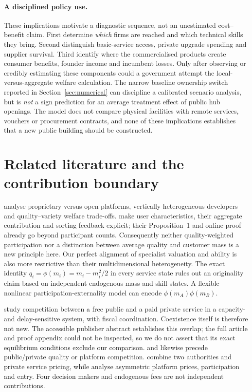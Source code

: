 \documentclass[11pt]{article}
\begin{document}
\paragraph{A disciplined policy use.}
These implications motivate a diagnostic sequence, not an unestimated cost--benefit claim. First determine \emph{which} firms are reached and which technical skills they bring. Second distinguish basic-service access, private upgrade spending and supplier survival. Third identify where the commercialised products create consumer benefits, founder income and incumbent losses. Only after observing or credibly estimating these components could a government attempt the local-versus-aggregate welfare calculation. The narrow baseline ownership switch reported in Section~\ref{sec:numerical} can discipline a calibrated scenario analysis, but is \emph{not} a sign prediction for an average treatment effect of public hub openings. The model does not compare physical facilities with remote services, vouchers or procurement contracts, and none of these implications establishes that a new public building should be constructed.

\section{Related literature and the contribution boundary}\label{sec:literature}

\citet{Hagiu2004,Hagiu2004b} analyse proprietary versus open platforms, vertically heterogeneous developers and quality--variety welfare trade-offs.
\citet{VeigaWeylWhite2017} make user characteristics, their aggregate contribution and sorting feedback explicit; their Proposition~1 and online proof already go beyond participant counts.
Consequently neither quality-weighted participation nor a distinction between average quality and customer mass is a new principle here.
Our perfect alignment of specialist valuation and ability is also more restrictive than their multidimensional heterogeneity.
The exact identity $q_i=\phi(m_i)=m_i-m_i^2/2$ in every service state rules out an originality claim based on independent endogenous mass and skill states.
A flexible nonlinear participation-externality model can encode $\phi(m_A)\phi(m_B)$.

\citet{HuaChenZhang2016} study competition between a free public and a paid private service in a capacity- and delay-sensitive system, with fiscal coordination.
Coexistence itself is therefore not new.
The accessible publisher abstract establishes this overlap; the full article and proof appendix could not be inspected, so we do not assert that its exact equilibrium conditions exclude our comparison.
\citet{LaineMa2017} and \citet{Kim2024} likewise precede public/private quality or platform competition.
\citet{LongWong2009} combine two authorities and private service pricing, while \citet{PeitzSato2026} analyse asymmetric platform prices, participation and entry.
Four decision makers and endogenous fees are not independent contributions.
\end{document}
